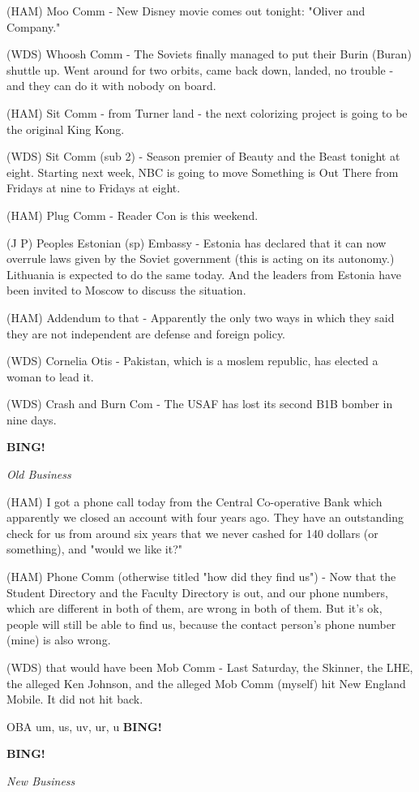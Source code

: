 \documentclass[12pt]{article}
\newcommand{\bing}{{\bf BING!} }
\newcommand{\goto}[1]{\bing \vskip 12pt \centerline{{\em{#1}}}}
\begin{document}
(HAM) Moo Comm - New Disney movie comes out tonight: "Oliver and Company."  

(WDS) Whoosh Comm - The Soviets finally managed to put their Burin (Buran) shuttle up. Went around for two orbits, came back down, landed, no trouble - and they can do it with nobody on board.

(HAM) Sit Comm - from Turner land - the next colorizing project is going to be the original King Kong.

(WDS) Sit Comm (sub 2) - Season premier of Beauty and the Beast tonight at eight. Starting next week, NBC is going to move Something is Out There from Fridays at nine to Fridays at eight.

(HAM) Plug Comm - Reader Con is this weekend.

(J P) Peoples Estonian (sp) Embassy - Estonia has declared that it can now overrule laws given by the Soviet government (this is acting on its autonomy.)  Lithuania is expected to do the same today. And the leaders from Estonia have been invited to Moscow to discuss the situation.

(HAM) Addendum to that - Apparently the only two ways in which they said they are not independent are defense and foreign policy.

(WDS) Cornelia Otis - Pakistan, which is a moslem republic, has elected a woman to lead it.

(WDS) Crash and Burn Com - The USAF has lost its second B1B bomber in nine days.

\goto{Old Business}

(HAM) I got a phone call today from the Central Co-operative Bank which apparently we closed an account with four years ago. They have an outstanding check for us from around six years that we never cashed for 140 dollars (or something), and "would we like it?"

(HAM) Phone Comm (otherwise titled "how did they find us") - Now that the Student Directory and the Faculty Directory is out, and our phone numbers, which are different in both of them, are wrong in both of them. But it's ok, people will still be able to find us, because the contact person's phone number (mine) is also wrong.

(WDS) that would have been Mob Comm - Last Saturday, the Skinner, the LHE, the alleged Ken Johnson, and the alleged Mob Comm (myself) hit New England Mobile. It did not hit back.

OBA um, us, uv, ur, u \bing

\goto{New Business}
\end{document}
